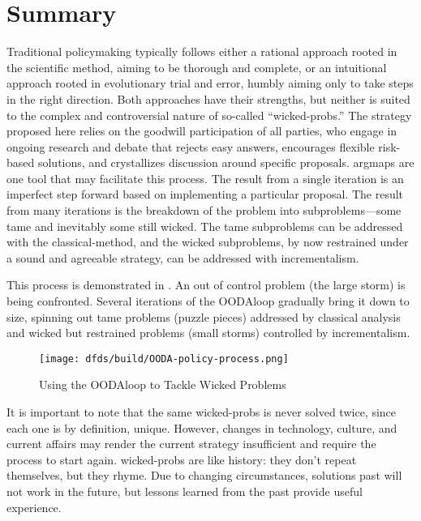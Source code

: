 \section{Summary}

Traditional policymaking typically follows either a rational approach rooted in the scientific method, aiming to be
thorough and complete, or an intuitional approach rooted in evolutionary trial and error, humbly aiming only to take
steps in the right direction. Both approaches have their strengths, but neither is suited to the complex and
controversial nature of so-called ``\acp{wicked-prob}.'' The strategy proposed here relies on the goodwill participation
of all parties, who engage in ongoing research and debate that rejects easy answers, encourages flexible risk-based
solutions, and crystallizes discussion around specific proposals. \Acp{argmap} are one tool that may facilitate this
process. The result from a single iteration is an imperfect step forward based on implementing a particular proposal.
The result from many iterations is the breakdown of the problem into subproblems---some tame and inevitably some still
wicked. The tame subproblems can be addressed with the \ac{classical-method}, and the wicked subproblems, by now
restrained under a sound and agreeable strategy, can be addressed with \ac{incrementalism}.


This process is demonstrated in . An out of control problem (the large storm) is being
confronted. Several iterations of the \ac{OODAloop} gradually bring it down to size, spinning out tame problems (puzzle
pieces) addressed by classical analysis and wicked but restrained problems (small storms) controlled by
\ac{incrementalism}.

\begin{figure}[h]
  \centering\CaptionFontSize
  \texttt{[image: dfds/build/OODA-policy-process.png]}
  \caption{Using the \ac{OODAloop} to Tackle Wicked Problems}
  \label{fig-policy-ooda-process}
\end{figure}

It is important to note that the same \acp{wicked-prob} is never solved twice, since each one is by definition, unique.
However, changes in technology, culture, and current affairs may render the current strategy insufficient and require
the process to start again. \Acp{wicked-prob} are like history: they don't repeat themselves, but they rhyme. Due to
changing circumstances, solutions past will not work in the future, but lessons learned from the past provide useful
experience.

